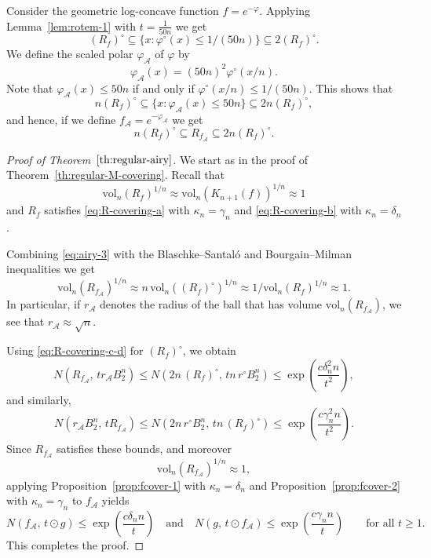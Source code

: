\documentclass[11pt,leqno]{article}
\theoremstyle{definition}
\theoremstyle{remark}
\numberwithin{equation}{section}
\newcommand{\vol}{\mathrm{vol}}
\newcommand{\ls}{\leqslant}
\newcommand{\gr}{\geqslant}
\begin{document}
Consider the geometric log-concave function $f=e^{-\varphi}$. Applying Lemma~\ref{lem:rotem-1} with
$t=\frac{1}{50n}$ we get
\begin{equation}\label{eq:airy-1}(R_f)^{\circ}\subseteq \{x:\varphi^{\circ}(x)\ls 1/(50n)\}\subseteq 2(R_f)^{\circ}.\end{equation}
We define the scaled polar $\varphi_{\mathcal{A}}$ of $\varphi$ by 
$$\varphi_{\mathcal{A}}(x)=(50n)^2\varphi^{\circ}(x/n).$$
Note that $\varphi_{\mathcal{A}}(x)\ls 50n$ if and only if $\varphi^{\circ}(x/n)\ls 1/(50n)$. This shows that
\begin{equation}\label{eq:airy-2}n(R_f)^{\circ}\subseteq\{x:\varphi_{\mathcal{A}}(x)\ls 50n\}\subseteq 2n(R_f)^{\circ},\end{equation}
and hence, if we define $f_{\mathcal{A}}=e^{-\varphi_{\mathcal{A}}}$ we get
\begin{equation}\label{eq:airy-3}n(R_f)^{\circ}\subseteq R_{f_{\mathcal{A}}}\subseteq 2n(R_f)^{\circ}.\end{equation}


\begin{proof}[Proof of Theorem~$\ref{th:regular-airy}$]
We start as in the proof of Theorem~\ref{th:regular-M-covering}. Recall that
$$\vol_n(R_f)^{1/n}\approx \vol_n(K_{n+1}(f))^{1/n}\approx 1$$ 
and $R_f$ satisfies \eqref{eq:R-covering-a} with $\kappa_n=\gamma_n$ and \eqref{eq:R-covering-b} with $\kappa_n=\delta_n$.

\smallskip 

Combining \eqref{eq:airy-3} with the Blaschke--Santal\'{o} and Bourgain--Milman inequalities we get
\begin{equation*}
\vol_n(R_{f_{\mathcal{A}}})^{1/n}\approx 
n\,\vol_n((R_f)^{\circ})^{1/n}\approx
1 \big/ \vol_n(R_f)^{1/n}\approx 1.
\end{equation*}
In particular, if $r_{\mathcal{A}}$ denotes the radius of the ball that has volume $\vol_n(R_{f_{\mathcal{A}}})$,
we see that $r_{\mathcal{A}}\approx \sqrt{n}$.

Using \eqref{eq:R-covering-c-d} for $(R_f)^{\circ}$, we obtain
$$N(R_{f_{\mathcal{A}}},\, t r_{\mathcal{A}} B_2^n)\ls N(2n\,(R_f)^{\circ},\, tn\,r^{\circ}B_2^n)
\ls \exp\!\left(\frac{c\delta_n^2 n}{t^2}\right),$$
and similarly,
$$N(r_{\mathcal{A}}B_2^n,\, t R_{f_{\mathcal{A}}})\ls N(2n\,r^{\circ}B_2^n,\, tn\, (R_f)^{\circ})
\ls \exp\!\left(\frac{c\gamma_n^2 n}{t^2}\right).$$
Since $R_{f_{\mathcal{A}}}$ satisfies these bounds, and moreover
$$\vol_n(R_{f_{\mathcal{A}}})^{1/n}\approx 1,$$
applying Proposition~\ref{prop:fcover-1} with $\kappa_n=\delta_n$ and Proposition~\ref{prop:fcover-2} with $\kappa_n=\gamma_n$ to $f_{\mathcal{A}}$ yields
$$N(f_{\mathcal{A}},\, t\odot g)\ls \exp\!\left(\frac{c\delta_n n}{t}\right)\quad \text{and}\quad  N(g,\, t\odot f_{\mathcal{A}})
\ls \exp\!\left(\frac{c\gamma_n n}{t}\right)
\qquad\text{for all } t\gr 1.$$
This completes the proof.
\end{proof}
\end{document}
